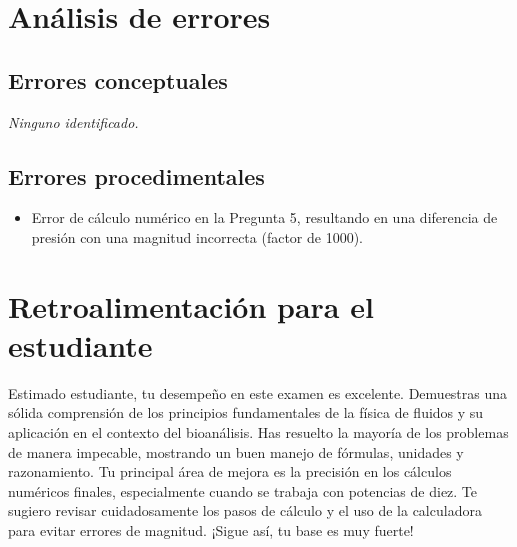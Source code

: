 \documentclass[11pt,a4paper]{article}
\begin{document}
\section*{Análisis de errores}

\subsection*{Errores conceptuales}
\textit{Ninguno identificado.}

\subsection*{Errores procedimentales}
\begin{itemize}[leftmargin=1.5em, itemsep=2pt]
  \item Error de cálculo numérico en la Pregunta 5, resultando en una diferencia de presión con una magnitud incorrecta (factor de 1000).
\end{itemize}

\section*{Retroalimentación para el estudiante}
\begin{tcolorbox}[cajaRecomendacion, title={Dirigido a: anamerc acuna 33279962}]
Estimado estudiante, tu desempeño en este examen es excelente. Demuestras una sólida comprensión de los principios fundamentales de la física de fluidos y su aplicación en el contexto del bioanálisis. Has resuelto la mayoría de los problemas de manera impecable, mostrando un buen manejo de fórmulas, unidades y razonamiento. Tu principal área de mejora es la precisión en los cálculos numéricos finales, especialmente cuando se trabaja con potencias de diez. Te sugiero revisar cuidadosamente los pasos de cálculo y el uso de la calculadora para evitar errores de magnitud. ¡Sigue así, tu base es muy fuerte!
\end{tcolorbox}

\end{document}
